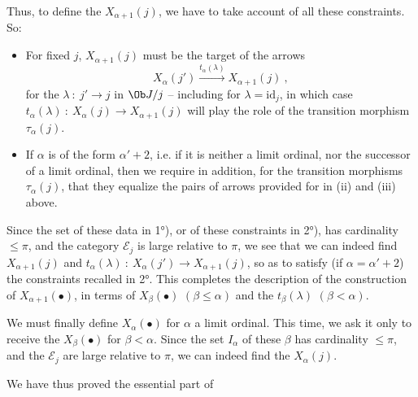 Thus, to define the $X_{\alpha+1}(j)$, we have to take account of all these constraints. So:
\begin{itemize}[leftmargin=3em]
\item[1°)] For fixed $j$, $X_{\alpha+1}(j)$ must be the target of the arrows
\[
X_\alpha(j') \xrightarrow{t_\alpha(\lambda)} X_{\alpha+1}(j)\ ,
\]
for the $\lambda\ :\ j'\longrightarrow j$ in $\Ob J/j$ -- including for $\lambda=\mathrm{id}_j$, in which case $t_\alpha(\lambda)\ :\ X_\alpha(j)\longrightarrow X_{\alpha+1}(j)$ will play the role of the transition morphism $\tau_\alpha(j)$.
\item[2°)] If $\alpha$ is of the form $\alpha'+2$, i.e. if it is neither a limit ordinal, nor the successor of a limit ordinal, then we require in addition, for the transition morphisms $\tau_\alpha(j)$, that they equalize the pairs of arrows provided for in (ii) and (iii) above.
\end{itemize}
Since the set of these data in 1°), or of these constraints in 2°),
has cardinality $\leqslant\pi$, and the category $\mathcal{E}_j$ is large relative to $\pi$, we see that we can indeed find $X_{\alpha+1}(j)$ and $t_\alpha(\lambda)\ :\ X_\alpha(j')\longrightarrow X_{\alpha+1}(j)$, so as to satisfy (if $\alpha=\alpha'{+}2$) the constraints recalled in 2°. This completes the description of the construction of $X_{\alpha+1}(\bullet)$, in terms of $X_\beta(\bullet)$ $(\beta\leqslant\alpha)$ and the $t_\beta(\lambda)$ $(\beta<\alpha)$.

We must finally define $X_\alpha(\bullet)$ for $\alpha$ a limit ordinal. This time, we ask it only to receive the $X_\beta(\bullet)$ for $\beta<\alpha$. Since the set $I_\alpha$ of these $\beta$ has cardinality $\leqslant\pi$, and the $\mathcal{E}_j$ are large relative to $\pi$, we can indeed find the $X_\alpha(j)$.

We have thus proved the essential part of

